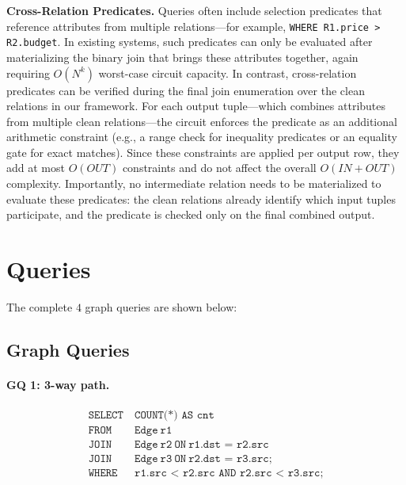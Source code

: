 \documentclass[sigconf]{acmart}
\begin{document}
\noindent\textbf{Cross-Relation Predicates.}
Queries often include selection predicates that reference attributes from multiple relations---for example, \texttt{WHERE R1.price > R2.budget}. In existing systems, such predicates can only be evaluated after materializing the binary join that brings these attributes together, again requiring $O(N^k)$ worst-case circuit capacity. In contrast, cross-relation predicates can be verified during the final join enumeration over the clean relations in our framework. For each output tuple---which combines attributes from multiple clean relations---the circuit enforces the predicate as an additional arithmetic constraint (e.g., a range check for inequality predicates or an equality gate for exact matches). Since these constraints are applied per output row, they add at most $O(\mathit{OUT})$ constraints and do not affect the overall $O(\mathit{IN} + \mathit{OUT})$ complexity. Importantly, no intermediate relation needs to be materialized to evaluate these predicates: the clean relations already identify which input tuples participate, and the predicate is checked only on the final combined output.



\section{Queries}
\label{app:graph_query}
The complete $4$ graph queries are shown below:

\subsection{Graph Queries}
\paragraph{GQ 1: 3-way path.}
\[
\begin{aligned}
\texttt{SELECT}\ &\texttt{COUNT(*) AS cnt}\\
\texttt{FROM}\ &\texttt{Edge}\ \texttt{r1}\\
\texttt{JOIN}\ &\texttt{Edge}\ \texttt{r2}\ \texttt{ON}\ \texttt{r1.dst = r2.src}\\
\texttt{JOIN}\ &\texttt{Edge}\ \texttt{r3}\ \texttt{ON}\ \texttt{r2.dst = r3.src;}\\
\texttt{WHERE}\ &\texttt{r1.src < r2.src AND r2.src < r3.src;}
\end{aligned}
\]
\end{document}
